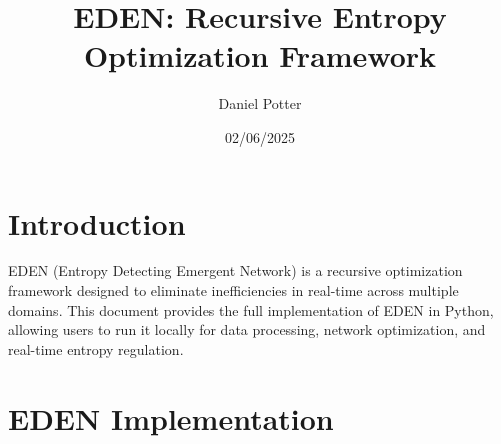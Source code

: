 \documentclass{article}
\title{EDEN: Recursive Entropy Optimization Framework}
\author{Daniel Potter}
\date{02/06/2025}
\begin{document}
\maketitle

\section{Introduction}

EDEN (Entropy Detecting Emergent Network) is a recursive optimization framework designed to eliminate inefficiencies in real-time across multiple domains. This document provides the full implementation of EDEN in Python, allowing users to run it locally for data processing, network optimization, and real-time entropy regulation.

\section{EDEN Implementation}
\end{document}
